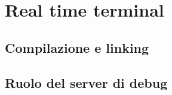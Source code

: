 \chapter{Real time terminal}
    \section{Compilazione e linking}
    \section{Ruolo del server di debug}